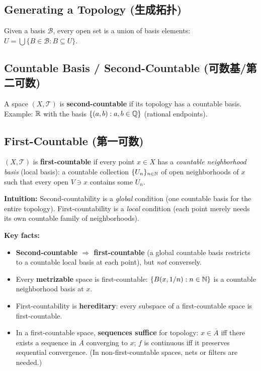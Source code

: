 \documentclass{article}
\begin{document}
\subsection{Generating a Topology (生成拓扑)}\label{def:generate-topo}
Given a basis $\mathcal{B}$, every open set is a union of basis
elements: $U = \bigcup\{B \in \mathcal{B} : B \subseteq U\}$.

\subsection{Countable Basis / Second-Countable
(可数基/第二可数)}\label{def:second-countable}
A space $(X, \mathcal{T})$ is \textbf{second-countable} if its
topology has a countable basis.
Example: $\mathbb{R}$ with the basis $\{(a, b) : a, b \in \mathbb{Q}\}$ (rational endpoints).

\subsection{First-Countable (第一可数)}\label{def:first-countable}
\begin{definition}
  $(X, \mathcal{T})$ is \textbf{first-countable} if every point
  $x \in X$ has a \emph{countable neighborhood basis} (local basis): a
  countable collection $\{U_n\}_{n \in \mathbb{N}}$ of open neighborhoods of $x$
  such that every open $V \ni x$ contains some $U_n$.
\end{definition}

\textbf{Intuition:} Second-countability is a \emph{global} condition (one
countable basis for the entire topology).  First-countability is a \emph{local}
condition (each point merely needs its own countable family of neighborhoods).

\textbf{Key facts:}
\begin{itemize}
  \item \textbf{Second-countable $\Rightarrow$ first-countable}
    (a global countable basis restricts to a countable local basis at each
    point), but \emph{not} conversely.
  \item Every \textbf{metrizable} space is first-countable:
    $\{B(x, 1/n) : n \in \mathbb{N}\}$ is a countable neighborhood basis at $x$.
  \item First-countability is \textbf{hereditary}: every subspace of a
    first-countable space is first-countable.
  \item In a first-countable space, \textbf{sequences suffice} for topology:
    $x \in \overline{A}$ iff there exists a sequence in $A$ converging to $x$;
    $f$ is continuous iff it preserves sequential convergence.
    (In non-first-countable spaces, nets or filters are needed.)
\end{itemize}
\end{document}
